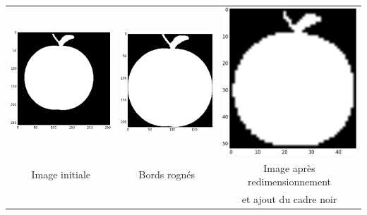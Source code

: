 \documentclass[a4paper,10pt]{article} %
\theoremstyle{definition} %
\begin{document}
\begin{center}
  \begin{tabular}{c c c}
     \includegraphics[scale=0.25]{pictures/apple.png} & \includegraphics[scale=0.25]{pictures/apple-crop.png} & \includegraphics[scale=0.25]{pictures/apple-normalize.png} \\
    Image initiale & Bords rognés & Image après redimensionnement  \\
                          &                        &  et ajout du cadre noir
      \end{tabular}
\end{center}



\end{document}
